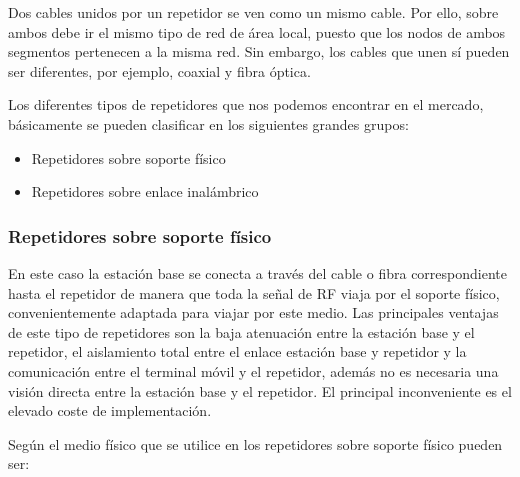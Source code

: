 \documentclass[a4paper]{article}
\begin{document}
Dos cables unidos por un repetidor se ven como un mismo cable. Por ello,
sobre ambos debe ir el mismo tipo de red de área local, puesto que los
nodos de ambos segmentos pertenecen a la misma red. Sin embargo, los
cables que unen sí pueden ser diferentes, por ejemplo, coaxial y fibra
óptica.

\noindent{}

Los diferentes tipos de repetidores que nos podemos encontrar en el
mercado, básicamente se pueden clasificar en los siguientes grandes
grupos:

\begin{itemize}
  \item Repetidores sobre soporte físico

  \item Repetidores sobre enlace inalámbrico    
\end{itemize}

\subsubsection{Repetidores sobre soporte físico}

En este caso la estación base se conecta a través del cable o fibra
correspondiente hasta el repetidor de manera que toda la señal de RF
viaja por el soporte físico, convenientemente adaptada para viajar por
este medio. Las principales ventajas de este tipo de repetidores son la
baja atenuación entre la estación base y el repetidor, el aislamiento
total entre el enlace estación base y repetidor y la comunicación entre
el terminal móvil y el repetidor, además no es necesaria una visión
directa entre la estación base y el repetidor. El principal
inconveniente es el elevado coste de implementación.

Según el medio físico que se utilice en los repetidores sobre soporte
físico pueden ser:
\end{document}
